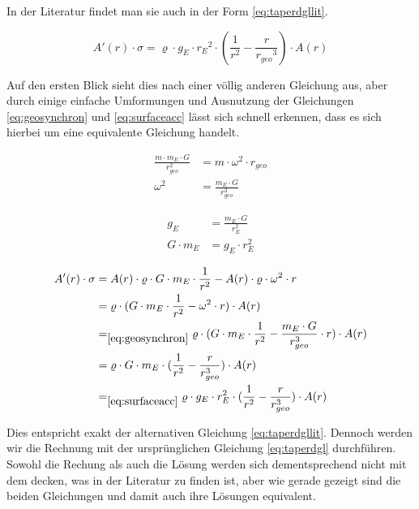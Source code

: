 \documentclass[a4paper, 10pt]{report}
\begin{document}

In der Literatur\cite{PE75} findet man sie auch in der Form \ref{eq:taperdgllit}.

\begin{equation}
A'(r) \cdot \sigma = \varrho \cdot g_E \cdot {r_E}^2 \cdot (\frac{1}{r^2} - \frac{r}{{r_{geo}}^3}) \cdot A(r)
\label{eq:taperdgllit}
\end{equation}

Auf den ersten Blick sieht dies nach einer völlig anderen Gleichung aus, aber durch einige einfache Umformungen und Ausnutzung der Gleichungen \ref{eq:geosynchron} und \ref{eq:surfaceacc} lässt sich schnell erkennen, dass es sich hierbei um eine equivalente Gleichung handelt.

\begin{align}
\frac{m \cdot m_E \cdot G}{r_{geo}^2} &= m \cdot \omega^2 \cdot r_{geo}\nonumber \\
\omega^2 &= \frac{m_E \cdot G}{r_{geo}^3}
\label{eq:geosynchron}
\end{align}

\begin{align}
g_E &= \frac{m_E \cdot G}{r_E^2} \nonumber \\
G \cdot m_E &= g_E \cdot r_E^2
\label{eq:surfaceacc}
\end{align}

\begin{align*}
A'(r) \cdot \sigma &= A(r) \cdot \varrho \cdot G \cdot m_E \cdot \frac{1}{r^2} - A(r) \cdot \varrho \cdot \omega^2 \cdot r\\
&= \varrho \cdot (G \cdot m_E \cdot \frac{1}{r^2} - \omega^2 \cdot r) \cdot A(r)\\
&=_{\ref{eq:geosynchron}} \varrho \cdot (G \cdot m_E \cdot \frac{1}{r^2} - \frac{m_E \cdot G}{r_{geo}^3} \cdot r) \cdot A(r)\\
&= \varrho \cdot G \cdot m_E \cdot (\frac{1}{r^2} - \frac{r}{r_{geo}^3}) \cdot A(r)\\
&=_{\ref{eq:surfaceacc}} \varrho \cdot g_E \cdot r_E^2 \cdot (\frac{1}{r^2} - \frac{r}{r_{geo}^3}) \cdot A(r)\\
\end{align*}

Dies entspricht exakt der alternativen Gleichung \ref{eq:taperdgllit}. Dennoch werden wir die Rechnung mit der ursprünglichen Gleichung \ref{eq:taperdgl} durchführen. Sowohl die Rechung als auch die Lösung werden sich dementsprechend nicht mit dem decken, was in der Literatur zu finden ist, aber wie gerade gezeigt sind die beiden Gleichungen und damit auch ihre Lösungen equivalent.
\end{document}
